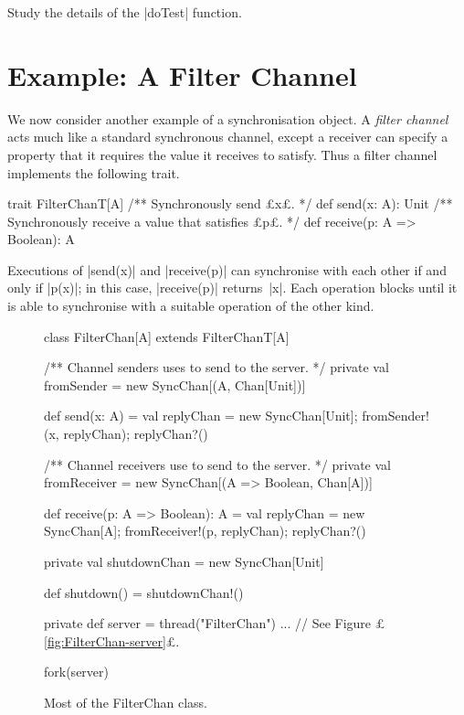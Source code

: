 \begin{instruction}
Study the details of the |doTest| function.
\end{instruction}


\section{Example: A Filter Channel}

We now consider another example of a synchronisation object.  A \emph{filter
  channel} acts much like a standard synchronous channel, except a receiver
can specify a property that it requires the value it receives to satisfy.
Thus a filter channel implements the following trait.
%
\begin{scala}
trait FilterChanT[A]{
  /** Synchronously send £x£. */
  def send(x: A): Unit
  /** Synchronously receive a value that satisfies £p£. */
  def receive(p: A => Boolean): A 
}
\end{scala}
%
Executions of |send(x)| and |receive(p)| can synchronise with each other
if and only if |p(x)|; in this case, |receive(p)| returns~|x|.  Each operation
blocks until it is able to synchronise with a suitable operation of the other
kind. 


\begin{figure}
\begin{scala}
class FilterChan[A] extends FilterChanT[A]{
  /** Channel senders uses to send to the server. */
  private val fromSender = new SyncChan[(A, Chan[Unit])]

  def send(x: A) = { 
    val replyChan = new SyncChan[Unit]; fromSender!(x, replyChan); replyChan?()
  }

  /** Channel receivers use to send to the server. */
  private val fromReceiver = new SyncChan[(A => Boolean, Chan[A])]
  
  def receive(p: A => Boolean): A = {
    val replyChan = new SyncChan[A]; fromReceiver!(p, replyChan); replyChan?()
  }

  private val shutdownChan = new SyncChan[Unit]

  def shutdown() = shutdownChan!() 

  private def server = thread("FilterChan"){ ... } // See Figure £\ref{fig:FilterChan-server}£.

  fork(server)
}
\end{scala}
\caption{Most of the {\scalashape FilterChan} class.}
\label{fig:FilterChan}
\end{figure}

